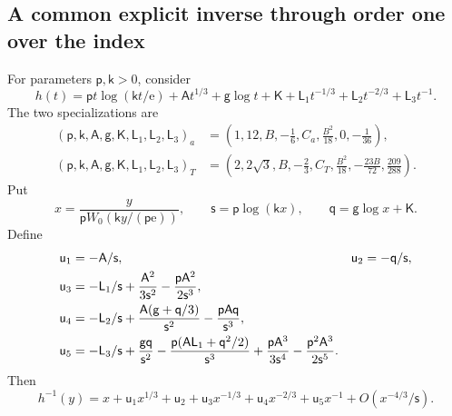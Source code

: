 \documentclass[11pt,letterpaper]{article}
\newcommand{\ee}{\mathrm e}
\theoremstyle{remark}
\begin{document}
\subsection{A common explicit inverse through order one over the index}
For parameters $\mathsf p,\mathsf k>0$, consider
\begin{equation}
 h(t)=\mathsf pt\log(\mathsf kt/\ee)+\mathsf At^{1/3}+\mathsf g\log t+\mathsf K
                     +\mathsf L_1t^{-1/3}+\mathsf L_2t^{-2/3}+\mathsf L_3t^{-1}.         \label{tcn:b:generic-h}
\end{equation}
The two specializations are
\begin{align*}
 (\mathsf p,\mathsf k,\mathsf A,\mathsf g,\mathsf K,\mathsf L_1,\mathsf L_2,\mathsf L_3)_a
   &=\left(1,12,B,-\tfrac16,C_a,\tfrac{B^2}{18},0,-\tfrac1{36}\right),\\
 (\mathsf p,\mathsf k,\mathsf A,\mathsf g,\mathsf K,\mathsf L_1,\mathsf L_2,\mathsf L_3)_T
   &=\left(2,2\sqrt3,B,-\tfrac23,C_T,\tfrac{B^2}{18},
                  -\tfrac{23B}{72},\tfrac{209}{288}\right).
\end{align*}
Put
\[
 x=\frac{y}{\mathsf pW_0(\mathsf ky/(\mathsf p\ee))},\qquad \mathsf s=\mathsf p\log(\mathsf kx),\qquad \mathsf q=\mathsf g\log x+\mathsf K.
\]
Define
\begin{align}
 \mathsf u_1&=-\mathsf A/\mathsf s,&\mathsf u_2&=-\mathsf q/\mathsf s,\notag\\
 \mathsf u_3&=-\mathsf L_1/\mathsf s+\frac{\mathsf A^2}{3\mathsf s^2}-\frac{\mathsf p\mathsf A^2}{2\mathsf s^3},\notag\\
 \mathsf u_4&=-\mathsf L_2/\mathsf s+\frac{\mathsf A(\mathsf g+\mathsf q/3)}{\mathsf s^2}-\frac{\mathsf p\mathsf A\mathsf q}{\mathsf s^3},\notag\\
 \mathsf u_5&=-\mathsf L_3/\mathsf s+\frac{\mathsf g\mathsf q}{\mathsf s^2}-\frac{\mathsf p(\mathsf A\mathsf L_1+\mathsf q^2/2)}{\mathsf s^3}
                      +\frac{\mathsf p\mathsf A^3}{3\mathsf s^4}-\frac{\mathsf p^2\mathsf A^3}{2\mathsf s^5}. \label{tcn:b:inverse-coeffs}
\end{align}
Then
\begin{equation}
 h^{-1}(y)=x+\mathsf u_1x^{1/3}+\mathsf u_2+\mathsf u_3x^{-1/3}+\mathsf u_4x^{-2/3}+\mathsf u_5x^{-1}
                          +O(x^{-4/3}/\mathsf s).                 \label{tcn:b:generic-inverse}
\end{equation}
\end{document}
